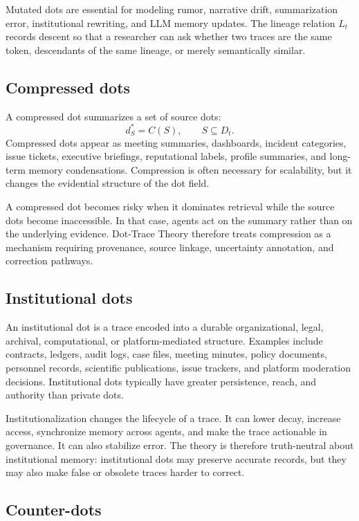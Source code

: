 \documentclass[11pt]{article}
\theoremstyle{remark}
\begin{document}
Mutated dots are essential for modeling rumor, narrative drift, summarization error, institutional rewriting, and LLM memory updates. The lineage relation $L_t$ records descent so that a researcher can ask whether two traces are the same token, descendants of the same lineage, or merely semantically similar.

\subsection{Compressed dots}\label{compressed-dots}

A compressed dot summarizes a set of source dots:
\[
d_S^*=C(S),\qquad S\subseteq D_t.
\]
Compressed dots appear as meeting summaries, dashboards, incident categories, issue tickets, executive briefings, reputational labels, profile summaries, and long-term memory condensations. Compression is often necessary for scalability, but it changes the evidential structure of the dot field.

A compressed dot becomes risky when it dominates retrieval while the source dots become inaccessible. In that case, agents act on the summary rather than on the underlying evidence. Dot-Trace Theory therefore treats compression as a mechanism requiring provenance, source linkage, uncertainty annotation, and correction pathways.

\subsection{Institutional dots}\label{institutional-dots}

An institutional dot is a trace encoded into a durable organizational, legal, archival, computational, or platform-mediated structure. Examples include contracts, ledgers, audit logs, case files, meeting minutes, policy documents, personnel records, scientific publications, issue trackers, and platform moderation decisions. Institutional dots typically have greater persistence, reach, and authority than private dots.

Institutionalization changes the lifecycle of a trace. It can lower decay, increase access, synchronize memory across agents, and make the trace actionable in governance. It can also stabilize error. The theory is therefore truth-neutral about institutional memory: institutional dots may preserve accurate records, but they may also make false or obsolete traces harder to correct.

\subsection{Counter-dots}\label{counter-dots}
\end{document}
